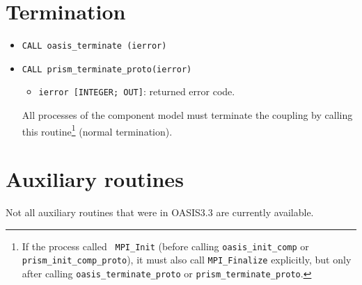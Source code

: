 \section{Termination}
\label{subsubsec_Termination}

\begin{itemize}

\item {\tt CALL oasis\_terminate       (ierror)}
\item {\tt CALL prism\_terminate\_proto(ierror)}
  \begin{itemize}
  \item {\tt ierror [INTEGER; OUT]}: returned error code.
  \end{itemize}
  All processes of the component model must terminate the coupling by
  calling this routine\footnote{If the process called {\tt
  MPI\_Init} (before calling {\tt oasis\_init\_comp} or {\tt prism\_init\_comp\_proto}), it must
  also call {\tt MPI\_Finalize} explicitly, but only after calling
  {\tt oasis\_terminate\_proto} or {\tt prism\_terminate\_proto}.} (normal termination). 

\end{itemize}


\section{Auxiliary routines}
\label{subsubsec_auxroutines}

Not all auxiliary routines that were in OASIS3.3 are currently available.

